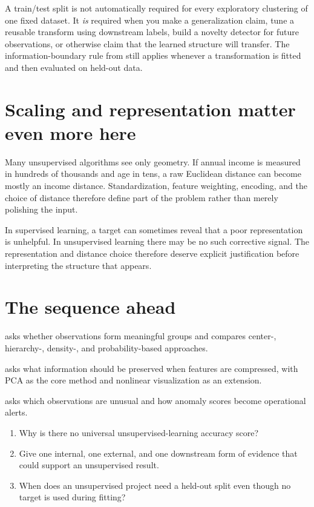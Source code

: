 A train/test split is not automatically required for every exploratory clustering of one fixed dataset. It \emph{is} required when you make a generalization claim, tune a reusable transform using downstream labels, build a novelty detector for future observations, or otherwise claim that the learned structure will transfer. The information-boundary rule from  still applies whenever a transformation is fitted and then evaluated on held-out data.

\section{Scaling and representation matter even more here}

Many unsupervised algorithms see only geometry. If annual income is measured in hundreds of thousands and age in tens, a raw Euclidean distance can become mostly an income distance. Standardization, feature weighting, encoding, and the choice of distance therefore define part of the problem rather than merely polishing the input.

\begin{keyidea}
In supervised learning, a target can sometimes reveal that a poor representation is unhelpful. In unsupervised learning there may be no such corrective signal. The representation and distance choice therefore deserve explicit justification before interpreting the structure that appears.
\end{keyidea}

\section{The sequence ahead}

\begin{description}[leftmargin=1.6in,style=nextline]
  \item[\chapref{ch:clustering}] asks whether observations form meaningful groups and compares center-, hierarchy-, density-, and probability-based approaches.
  \item[\chapref{ch:dimred}] asks what information should be preserved when features are compressed, with PCA as the core method and nonlinear visualization as an extension.
  \item[\chapref{ch:anomaly}] asks which observations are unusual and how anomaly scores become operational alerts.
\end{description}


\begin{quickcheck}
\begin{enumerate}
  \item Why is there no universal unsupervised-learning accuracy score?
  \item Give one internal, one external, and one downstream form of evidence that could support an unsupervised result.
  \item When does an unsupervised project need a held-out split even though no target is used during fitting?
\end{enumerate}
\end{quickcheck}

